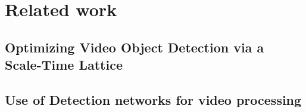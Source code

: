 
\chapter{Related work}

\section{Optimizing Video Object Detection via a Scale-Time Lattice}
\section{Use of Detection networks for video processing}
